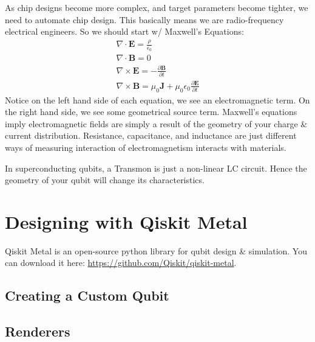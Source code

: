 

 As chip designs become more complex, and target parameters become tighter, we need to automate chip design.  This basically means we are radio-frequency electrical engineers. So we should start w/ Maxwell's Equations:
\begin{gather}
    \nabla \cdot \mathbf{E} = \frac{\rho}{\epsilon_0} \\
    \nabla \cdot \mathbf{B} = 0 \\
    \nabla \times \mathbf{E} = - \frac{\partial \mathbf{B}}{\partial t} \\
    \nabla \times \mathbf{B} = \mu_0 \mathbf{J} + \mu_0 \epsilon_0 \frac{\partial \mathbf{E}}{\partial t}
\end{gather}
Notice on the left hand side of each equation, we see an electromagnetic term. On the right hand side, we see some geometrical source term. Maxwell's equations imply electromagnetic fields are simply a result of the geometry of your charge \& current distribution. Resistance, capacitance, and inductance are just different ways of measuring interaction of electromagnetism interacts with materials.
\begin{center}
\end{center}
In superconducting qubits, a Transmon is just a non-linear LC circuit. Hence the geometry of your qubit will change its characteristics.


\section{Designing with Qiskit Metal}
Qiskit Metal is an open-source python library for qubit design \& simulation. You can download it here: \url{https://github.com/Qiskit/qiskit-metal}.

\subsection{Creating a Custom Qubit}


\subsection{Renderers}

